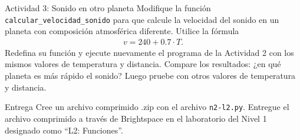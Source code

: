 \documentclass{ip-lab}
\begin{document}
\begin{sectionbox}{Actividad 3: Sonido en otro planeta}
Modifique la función \texttt{calcular\_velocidad\_sonido} para que calcule la velocidad del sonido en un planeta con composición atmosférica diferente. Utilice la fórmula
\begin{gather*}
    v = 240 + 0.7 \cdot T.
\end{gather*}
Redefina su función y ejecute nuevamente el programa de la Actividad 2 con los mismos valores de temperatura y distancia. Compare los resultados: ¿en qué planeta es más rápido el sonido? Luego pruebe con otros valores de temperatura y distancia. 
\end{sectionbox}

\begin{sectionbox}{Entrega}
Cree un archivo comprimido .zip con el archivo \texttt{n2-l2.py}. Entregue el archivo comprimido a través de Brightspace en el laboratorio del Nivel 1 designado como ``L2: Funciones''.
\end{sectionbox}
\end{document}
